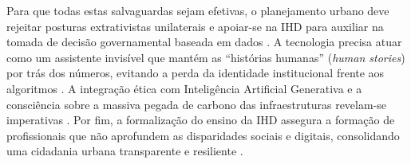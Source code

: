 \documentclass[
	12pt,				%
	oneside,			%
	a4paper,			%
	english,			%
	brazil				%
	]{abntex2ppgsi}
\begin{document}
    Para que todas estas salvaguardas sejam efetivas, o planejamento urbano deve rejeitar posturas extrativistas unilaterais e apoiar-se na IHD para auxiliar na tomada de decisão governamental baseada em dados \cite{Belizario2023Interacao}. A tecnologia precisa atuar como um assistente invisível que mantém as ``histórias humanas'' (\textit{human stories}) por trás dos números, evitando a perda da identidade institucional frente aos algoritmos \cite{Calvetti2021173, Briggs2021}. A integração ética com Inteligência Artificial Generativa e a consciência sobre a massiva pegada de carbono das infraestruturas revelam-se imperativas \cite{durango2024data, Pilling2022MoreThan, Turkay2021}. Por fim, a formalização do ensino da IHD assegura a formação de profissionais que não aprofundem as disparidades sociais e digitais, consolidando uma cidadania urbana transparente e resiliente \cite{coleti2024human, Kurze2023, Hayes2021, Refat2023, Chatzimichali2021160, Lindley2020}.
\end{document}
